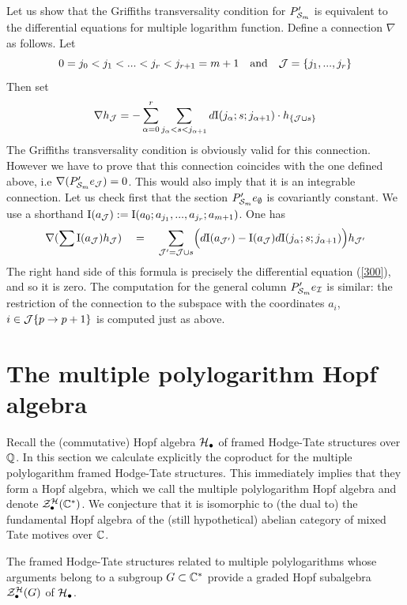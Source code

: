 \documentclass[10pt]{article}
\begin{document}
Let us  show that the Griffiths transversality condition for $P'_{{\cal S}_m}$  
is equivalent to the differential 
equations for multiple logarithm function.  
 Define a connection 
$\nabla$ as  follows. Let
$$
0=j_0 < j_1 < ... < j_r < j_{r+1} = m+1 \quad \mbox{and} \quad  
{\cal J} = \{j_1, ..., j_r \}
$$ 
Then  set 
$$
\nabla h_{\cal J} = - \sum_{\alpha =0}^{r} \sum_{j_{\alpha} < s < j_{\alpha+1}}
d{\rm I}(j_{\alpha}; s; j_{\alpha+1})\cdot h_{\{{\cal J} \cup s\}}
$$
The Griffiths transversality condition is obviously valid 
for this
 connection. However we have to prove that this connection coincides with 
the one defined above, i.e  
$\nabla(P'_{{\cal S}_m} e_{\cal J}) = 0$. This would also imply 
 that it is 
an integrable connection. 
Let us check first that the section $P'_{{\cal S}_m}e_{\emptyset}$ 
is covariantly constant. 
We use a shorthand ${\rm I}(a_{\cal J}):= {\rm I}(a_0; a_{j_1}, ..., a_{j_r}; a_{m+1})$. 
One has
$$
\nabla (\sum {\rm I}(a_{\cal J}) h_{\cal J}) \quad = \quad 
\sum_{{\cal J}' = {\cal J} \cup s} \Bigl(d{\rm I}(a_{{\cal J}'}) - {\rm I}(a_{\cal J}) 
d{\rm I}(j_{\alpha}; s; j_{\alpha+1})\Bigr)
h_{{\cal J}'}
$$
The right hand side of this formula is precisely the differential equation 
(\ref{300}), and so it is zero. The computation for the general 
column $P'_{{\cal S}_m}e_{\cal I}$ is similar: the restriction of the connection to the 
subspace with the coordinates $a_i$, $i \in 
{\cal J}{\{p \to p+1\}}$ is computed just  as 
 above.  


\section{The multiple polylogarithm Hopf algebra}

Recall the (commutative) 
Hopf 
algebra ${\cal H}_{\bullet}$ of framed Hodge-Tate structures over ${\mathbb Q}$. 
In this section we calculate explicitly the coproduct for the multiple polylogarithm framed  
Hodge-Tate structures. This immediately implies that 
they form a Hopf algebra, which we call the multiple polylogarithm Hopf algebra and denote 
${\cal Z}^{\cal H}_{\bullet}({\mathbb C}^*)$. 
We conjecture that it is isomorphic to  (the dual to) the 
fundamental Hopf algebra of the (still hypothetical) 
abelian category of mixed Tate motives over ${\mathbb C}$. 

The framed Hodge-Tate structures
related to multiple polylogarithms whose arguments 
belong to a subgroup $G \subset {\mathbb C}^*$  provide a 
graded Hopf subalgebra ${\cal Z}^{\cal H}_{\bullet}(G)$ of ${\cal H}_{\bullet}$. 
\end{document}
